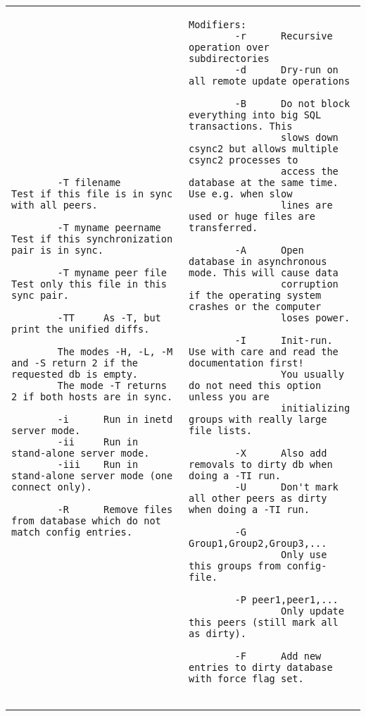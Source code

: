 \documentclass[a4paper,twocolumn]{article}
\begin{document}
\begin{figure*}[t]
\begin{center}
\begin{tabular}{|p{0.5\linewidth}|p{0.5\linewidth}|}
\begin{tiny}
\begin{verbatim}
        -T filename             Test if this file is in sync with all peers.

        -T myname peername      Test if this synchronization pair is in sync.

        -T myname peer file     Test only this file in this sync pair.

        -TT     As -T, but print the unified diffs.

        The modes -H, -L, -M and -S return 2 if the requested db is empty.
        The mode -T returns 2 if both hosts are in sync.

        -i      Run in inetd server mode.
        -ii     Run in stand-alone server mode.
        -iii    Run in stand-alone server mode (one connect only).

        -R      Remove files from database which do not match config entries.
\end{verbatim}
\end{tiny}

&

\begin{tiny}
\begin{verbatim}
Modifiers:
        -r      Recursive operation over subdirectories
        -d      Dry-run on all remote update operations

        -B      Do not block everything into big SQL transactions. This
                slows down csync2 but allows multiple csync2 processes to
                access the database at the same time. Use e.g. when slow
                lines are used or huge files are transferred.

        -A      Open database in asynchronous mode. This will cause data
                corruption if the operating system crashes or the computer
                loses power.

        -I      Init-run. Use with care and read the documentation first!
                You usually do not need this option unless you are
                initializing groups with really large file lists.

        -X      Also add removals to dirty db when doing a -TI run.
        -U      Don't mark all other peers as dirty when doing a -TI run.

        -G Group1,Group2,Group3,...
                Only use this groups from config-file.

        -P peer1,peer1,...
                Only update this peers (still mark all as dirty).

        -F      Add new entries to dirty database with force flag set.


\end{verbatim}
\end{tiny}
\end{tabular}
\end{center}
\end{figure*}
\end{document}
